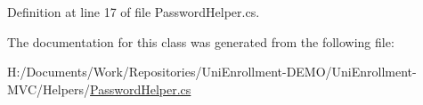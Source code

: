 Definition at line 17 of file Password\+Helper.\+cs.



The documentation for this class was generated from the following file\+:\begin{DoxyCompactItemize}
\item 
H\+:/\+Documents/\+Work/\+Repositories/\+Uni\+Enrollment-\/\+D\+E\+M\+O/\+Uni\+Enrollment-\/\+M\+V\+C/\+Helpers/\hyperlink{_password_helper_8cs}{Password\+Helper.\+cs}\end{DoxyCompactItemize}
